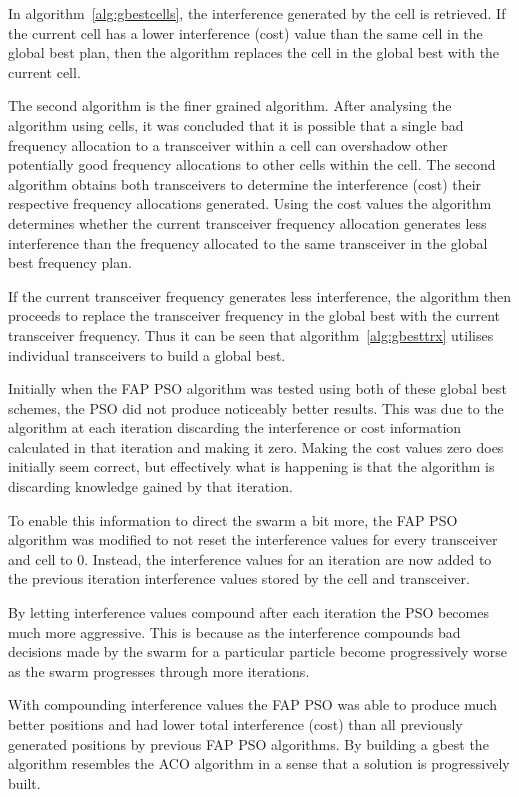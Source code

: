 In algorithm~\ref{alg:gbestcells}, the interference generated by the cell is retrieved. If the current cell has a lower interference (cost) value than the same cell in the global best plan, then the algorithm replaces the cell in the global best with the current cell.

The second algorithm is the finer grained algorithm. After analysing the algorithm using cells, it was concluded that it is possible that a single bad frequency allocation to a transceiver within a cell can overshadow other potentially good frequency allocations to other cells within the cell. The second algorithm obtains both transceivers to determine the interference (cost) their respective frequency allocations generated. Using the cost values the algorithm determines whether the current transceiver frequency allocation generates less interference than the frequency allocated to the same transceiver in the global best frequency plan.

If the current transceiver frequency generates less interference, the algorithm then proceeds to replace the transceiver frequency in the global best with the current transceiver frequency. Thus it can be seen that algorithm~\ref{alg:gbesttrx} utilises individual transceivers to build a global best.

Initially when the \gls{FAP} \gls{PSO} algorithm was tested using both of these global best schemes, the \gls{PSO} did not produce noticeably better results. This was due to the algorithm at each iteration discarding the interference or cost information calculated in that iteration and making it zero. Making the cost values zero does initially seem correct, but effectively what is happening is that the algorithm is discarding knowledge gained by that iteration.

To enable this information to direct the swarm a bit more, the \gls{FAP} \gls{PSO} algorithm was modified to not reset the interference values for every transceiver and cell to 0. Instead, the interference values for an iteration are now added to the previous iteration interference values stored by the cell and transceiver. 

By letting interference values compound after each iteration the \gls{PSO} becomes much more aggressive. This is because as the interference compounds bad decisions made by the swarm for a particular particle become progressively worse as the swarm progresses through more iterations.

With compounding interference values the \gls{FAP} \gls{PSO} was able to produce much better positions and had lower total interference (cost) than all previously generated positions by previous \gls{FAP} \gls{PSO} algorithms. By building a gbest the algorithm resembles the ACO algorithm in a sense that a solution is progressively built.

